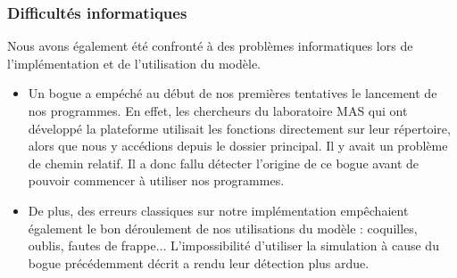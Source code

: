 \subsubsection{Difficultés informatiques}

Nous avons également été confronté à des problèmes informatiques lors de l'implémentation et de l'utilisation du modèle.
\begin{itemize}
	\item Un bogue a empéché au début de nos premières tentatives le lancement de nos programmes. En effet, les chercheurs
du laboratoire MAS qui ont développé la plateforme utilisait les fonctions directement sur leur répertoire, alors que nous y accédions depuis le dossier principal. Il y avait un problème de chemin relatif. Il a donc fallu détecter l'origine de ce bogue avant de pouvoir commencer à utiliser nos programmes. 
	
	\item De plus, des erreurs classiques sur notre implémentation empêchaient également le bon déroulement de nos utilisations du modèle : coquilles, oublis, fautes de frappe... L'impossibilité d'utiliser la simulation à cause du bogue précédemment décrit a rendu leur détection plus ardue.

\end{itemize}
